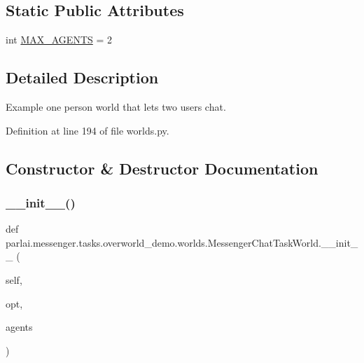 \subsection*{Static Public Attributes}
\begin{DoxyCompactItemize}
\item 
int \hyperlink{classparlai_1_1messenger_1_1tasks_1_1overworld__demo_1_1worlds_1_1MessengerChatTaskWorld_a1b4eb29fc582c6a0a6b7f82143791ce7}{M\+A\+X\+\_\+\+A\+G\+E\+N\+TS} = 2
\end{DoxyCompactItemize}


\subsection{Detailed Description}
\begin{DoxyVerb}Example one person world that lets two users chat.\end{DoxyVerb}
 

Definition at line 194 of file worlds.\+py.



\subsection{Constructor \& Destructor Documentation}
\mbox{\label{classparlai_1_1messenger_1_1tasks_1_1overworld__demo_1_1worlds_1_1MessengerChatTaskWorld_a18bd91724fd4998f675ca02f4de94d6f}} 
\subsubsection{\texorpdfstring{\+\_\+\+\_\+init\+\_\+\+\_\+()}{\_\_init\_\_()}}
{\footnotesize\ttfamily def parlai.\+messenger.\+tasks.\+overworld\+\_\+demo.\+worlds.\+Messenger\+Chat\+Task\+World.\+\_\+\+\_\+init\+\_\+\+\_\+ (\begin{DoxyParamCaption}\item[{}]{self,  }\item[{}]{opt,  }\item[{}]{agents }\end{DoxyParamCaption})}



